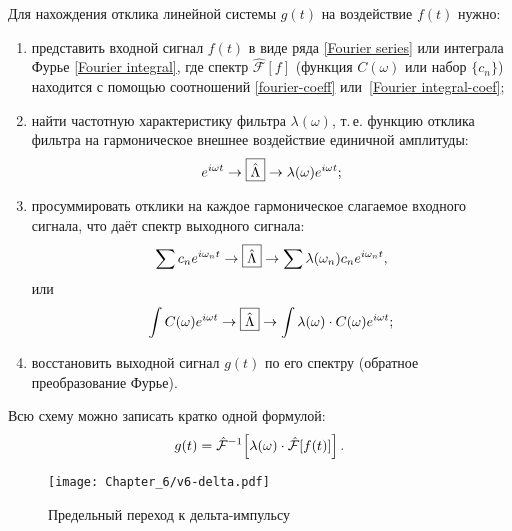 Для нахождения отклика линейной системы $g(t)$ на воздействие $f(t)$
нужно:
\begin{enumerate}
    \item представить входной сигнал $f(t)$ в виде ряда
    \eqref{Fourier series} или интеграла Фурье \eqref{Fourier integral},
где спектр $\hat{\mathcal{F}}[f]$ (функция $C(\omega)$ или набор $\{c_n\}$)
находится с помощью соотношений \eqref{fourier-coeff}
или~\eqref{Fourier integral-coef};

    \item найти частотную характеристику фильтра
$\lambda(\omega)$, т.\,е. функцию отклика фильтра на гармоническое внешнее воздействие
единичной амплитуды:
\begin{equation*}
    e^{i\omega t}\to\fbox{$\hat\Lambda$}\to \lambda(\omega)e^{i\omega t};
\end{equation*}

    \item просуммировать отклики на каждое гармоническое
    слагаемое входного сигнала, что даёт спектр выходного сигнала:
    \begin{equation*}
    \sum c_n e^{i\omega_n t} \to\fbox{$\hat\Lambda$}\to \sum \lambda(\omega_n)c_n e^{i\omega_n t},
    \end{equation*}
    или
    \begin{equation*}
    \int C(\omega) e^{i\omega t} \to\fbox{$\hat\Lambda$}\to
    \int \lambda(\omega)\cdot C(\omega)e^{i\omega t};
    \end{equation*}
    \item восстановить выходной сигнал $g(t)$ по его спектру
    (обратное преобразование Фурье).
\end{enumerate}
Всю схему можно записать кратко одной формулой:
    \begin{equation}
        \eqmark{linear-filter-fourier}
    g(t) = \hat{\mathcal{F}}^{-1}\!
    \left[\lambda(\omega)\cdot \hat{\mathcal{F}}[f(t)]\right].
    \end{equation}


\begin{wrapfigure}[14]{o}{0.25\textwidth}
     \centering\texttt{[image: Chapter\_6/v6-delta.pdf]}
     \caption{\footnotesize Предельный переход к дельта-импульсу}
\end{wrapfigure}

